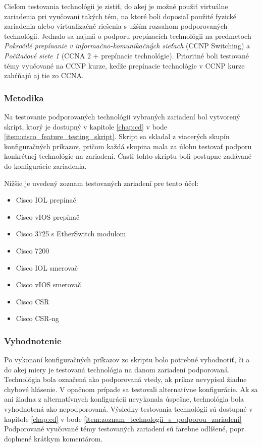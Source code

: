 Cieľom testovania technológii je zistiť, do akej je možné použiť virtuálne zariadenia pri vyučovaní takých tém, na ktoré boli doposiaľ použité fyzické zariadenia alebo virtualizačné riešenia s užším rozsahom podporovaných technológii. Jednalo sa najmä o podporu prepínacích technológii na predmetoch \emph{Pokročilé prepínanie v informačno-komunikačných sieťach} (CCNP Switching) a \emph{Počítačové siete 1} (CCNA 2 + prepínacie technológie). Prioritné boli testované témy vyučované na CCNP kurze, keďže prepínacie technológie v CCNP kurze zahŕňajú aj tie zo CCNA.





\subsubsection{Metodika}

Na testovanie podporovaných technológii vybraných zariadení bol vytvorený skript, ktorý je dostupný v kapitole \ref{chap:cd} v bode \ref{item:cisco_feature_testing_skript}. Skript sa skladal z viacerých skupín konfiguračných príkazov, pričom každá skupina mala za úlohu testovať podporu konkrétnej technológie na zariadení. Časti tohto skriptu boli postupne zadávané do konfigurácie zariadenia.

Nižšie je uvedený zoznam testovaných zariadení pre tento účel:

\begin{itemize}[noitemsep]
    \item Cisco IOL prepínač
    \item Cisco vIOS prepínač
    \item Cisco 3725 s EtherSwitch modulom
    \item Cisco 7200
    \item Cisco IOL smerovač
    \item Cisco vIOS smerovač
    \item Cisco CSR
    \item Cisco CSR-ng
\end{itemize}





\subsubsection{Vyhodnotenie}
\label{chap:testovanie_technologii_vyhodnotenie}

Po vykonaní konfiguračných príkazov zo skriptu bolo potrebné vyhodnotiť, či a do akej miery je testovaná technológia na danom zariadení podporovaná. Technológia bola označená ako podporovaná vtedy, ak príkaz nevypísal žiadne chybové hlásenie. V opačnom prípade sa testovali alternatívne konfigurácie. Ak sa ani žiadna z alternatívnych konfigurácii nevykonala úspešne, technológia bola vyhodnotená ako nepodporovaná. Výsledky testovania technológii sú dostupné v kapitole \ref{chap:cd} v bode \ref{item:zoznam_technologii_s_podporou_zariadeni} Podporované vyučované témy testovaných zariadení sú farebne odlíšené, popr. doplnené krátkym komentárom.


